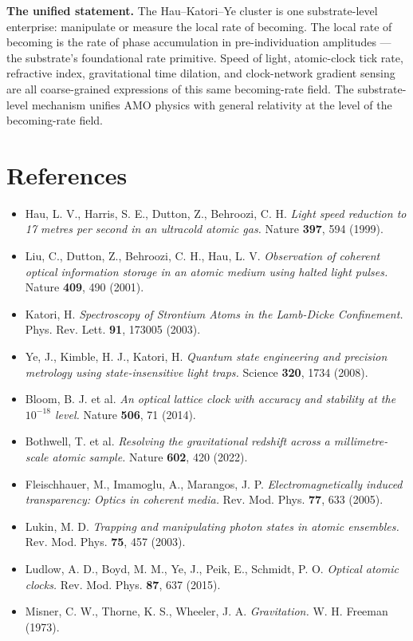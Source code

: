 \documentclass[11pt,a4paper]{article}
\begin{document}
\textbf{The unified statement.} The Hau--Katori--Ye cluster is one substrate-level enterprise: manipulate or measure the local rate of becoming. The local rate of becoming is the rate of phase accumulation in pre-individuation amplitudes --- the substrate's foundational rate primitive. Speed of light, atomic-clock tick rate, refractive index, gravitational time dilation, and clock-network gradient sensing are all coarse-grained expressions of this same becoming-rate field. The substrate-level mechanism unifies AMO physics with general relativity at the level of the becoming-rate field.

\section*{References}

\begin{itemize}[leftmargin=*,itemsep=2pt]
  \item Hau, L. V., Harris, S. E., Dutton, Z., Behroozi, C. H. \emph{Light speed reduction to 17 metres per second in an ultracold atomic gas.} Nature \textbf{397}, 594 (1999).
  \item Liu, C., Dutton, Z., Behroozi, C. H., Hau, L. V. \emph{Observation of coherent optical information storage in an atomic medium using halted light pulses.} Nature \textbf{409}, 490 (2001).
  \item Katori, H. \emph{Spectroscopy of Strontium Atoms in the Lamb-Dicke Confinement.} Phys. Rev. Lett. \textbf{91}, 173005 (2003).
  \item Ye, J., Kimble, H. J., Katori, H. \emph{Quantum state engineering and precision metrology using state-insensitive light traps.} Science \textbf{320}, 1734 (2008).
  \item Bloom, B. J. et al. \emph{An optical lattice clock with accuracy and stability at the $10^{-18}$ level.} Nature \textbf{506}, 71 (2014).
  \item Bothwell, T. et al. \emph{Resolving the gravitational redshift across a millimetre-scale atomic sample.} Nature \textbf{602}, 420 (2022).
  \item Fleischhauer, M., Imamoglu, A., Marangos, J. P. \emph{Electromagnetically induced transparency: Optics in coherent media.} Rev. Mod. Phys. \textbf{77}, 633 (2005).
  \item Lukin, M. D. \emph{Trapping and manipulating photon states in atomic ensembles.} Rev. Mod. Phys. \textbf{75}, 457 (2003).
  \item Ludlow, A. D., Boyd, M. M., Ye, J., Peik, E., Schmidt, P. O. \emph{Optical atomic clocks.} Rev. Mod. Phys. \textbf{87}, 637 (2015).
  \item Misner, C. W., Thorne, K. S., Wheeler, J. A. \emph{Gravitation.} W. H. Freeman (1973).
\end{itemize}
\end{document}
